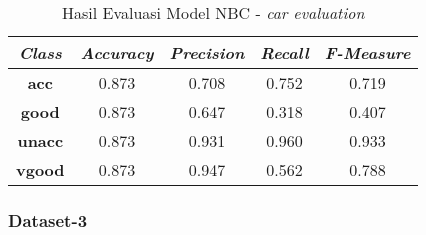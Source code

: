 \begin{table}[H]
\label{tab:model evaluation - car}
\centering
\caption{Hasil Evaluasi Model NBC - \textit{car evaluation}}
\begin{tabular}{ | c | c | c | c | c | }
\hline
\textit{\textbf{Class}} & \textit{\textbf{Accuracy}} & \textit{\textbf{Precision}} & \textit{\textbf{Recall}} & \textit{\textbf{F-Measure}}\\ \hline \hline
\textbf{acc} & 0.873 & 0.708 & 0.752 & 0.719 \\ \hline
\textbf{good} & 0.873 & 0.647 & 0.318 & 0.407 \\ \hline
\textbf{unacc} & 0.873 & 0.931 & 0.960 & 0.933 \\ \hline
\textbf{vgood} & 0.873 & 0.947 & 0.562 & 0.788 \\ \hline
\end{tabular}
\end{table}

\subsubsection{Dataset-3}
\label{subsubsec:Dataset-3}

